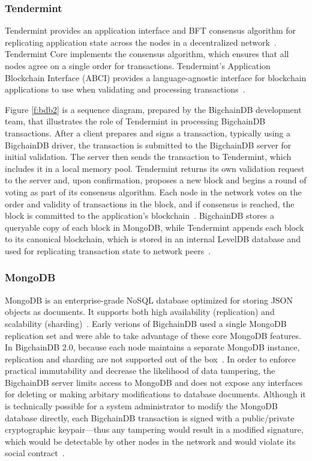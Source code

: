 \subsubsection{Tendermint}
Tendermint provides an application interface and BFT consensus
algorithm for replicating application state across the nodes in a
decentralized network~\cite{tender18}. Tendermint Core implements the
consensus algorithm, which ensures that all nodes agree on a single order
for transactions. Tendermint's Application Blockchain Interface (ABCI)
provides a language-agnostic interface for blockchain applications to use
when validating and processing transactions~\cite{tender18}.

Figure \ref{f:bdb2} is a sequence diagram, prepared by the BigchainDB
development team, that illustrates the role of Tendermint in processing
BigchainDB transactions. After a client prepares and signs a transaction,
typically using a BigchainDB driver, the transaction is submitted to the
BigchainDB server for initial validation. The server then sends the
transaction to Tendermint, which includes it in a local memory pool.
Tendermint returns its own validation request to the server and, upon
confirmation, proposes a new block and begins a round of voting as part of
its consensus algorithm. Each node in the network votes on the order and
validity of transactions in the block, and if consensus is reached, the
block is committed to the application's blockchain~\cite{gautam18, bigDB18}.
BigchainDB stores a queryable copy of each block in MongoDB, while
Tendermint appends each block to its canonical blockchain, which is stored
in an internal LevelDB database and used for replicating transaction state
to network peers~\cite{tender18, bigDB18}.

\subsubsection{MongoDB}
MongoDB is an enterprise-grade NoSQL database optimized for storing
JSON objects as documents. It supports both high availability (replication)
and scalability (sharding)~\cite{mongo18}. Early verions of BigchainDB used
a single MongoDB replication set and were able to take advantage of these
core MongoDB features. In BigchainDB 2.0, because each node maintains a
separate MongoDB instance, replication and sharding are not supported out of
the box~\cite{troyM18b}. In order to enforce practical immutability and
decrease the likelihood of data tampering, the BigchainDB server limits
access to MongoDB and does not expose any interfaces for deleting or making
arbitary modifications to database documents. Although it is technically
possible for a system administrator to modify the MongoDB database
directly, each BigchainDB transaction is signed with a public/private
cryptographic keypair---thus any tampering would result in a modified
signature, which would be detectable by other nodes in the network and would
violate its social contract~\cite{bigDB18}.


